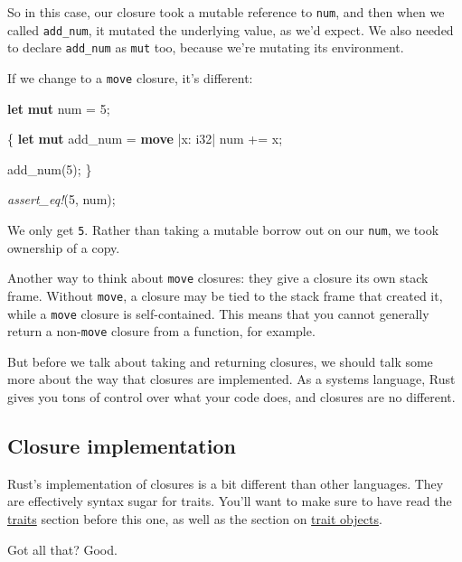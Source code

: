 \documentclass[a4paper,]{book}
\newenvironment{Shaded}{\begin{snugshade}}{\end{snugshade}}
\newcommand{\KeywordTok}[1]{\textcolor[rgb]{0.13,0.29,0.53}{\textbf{{#1}}}}
\newcommand{\DataTypeTok}[1]{\textcolor[rgb]{0.13,0.29,0.53}{{#1}}}
\newcommand{\DecValTok}[1]{\textcolor[rgb]{0.00,0.00,0.81}{{#1}}}
\newcommand{\PreprocessorTok}[1]{\textcolor[rgb]{0.56,0.35,0.01}{\textit{{#1}}}}
\newcommand{\NormalTok}[1]{{#1}}
\begin{document}
So in this case, our closure took a mutable reference to \texttt{num},
and then when we called \texttt{add\_num}, it mutated the underlying
value, as we'd expect. We also needed to declare \texttt{add\_num} as
\texttt{mut} too, because we're mutating its environment.

If we change to a \texttt{move} closure, it's different:

\begin{Shaded}
\begin{Highlighting}[]
\KeywordTok{let} \KeywordTok{mut} \NormalTok{num = }\DecValTok{5}\NormalTok{;}

\NormalTok{\{}
    \KeywordTok{let} \KeywordTok{mut} \NormalTok{add_num = }\KeywordTok{move} \NormalTok{|x: }\DataTypeTok{i32}\NormalTok{| num += x;}

    \NormalTok{add_num(}\DecValTok{5}\NormalTok{);}
\NormalTok{\}}

\PreprocessorTok{assert_eq!}\NormalTok{(}\DecValTok{5}\NormalTok{, num);}
\end{Highlighting}
\end{Shaded}

We only get \texttt{5}. Rather than taking a mutable borrow out on our
\texttt{num}, we took ownership of a copy.

Another way to think about \texttt{move} closures: they give a closure
its own stack frame. Without \texttt{move}, a closure may be tied to the
stack frame that created it, while a \texttt{move} closure is
self-contained. This means that you cannot generally return a
non-\texttt{move} closure from a function, for example.

But before we talk about taking and returning closures, we should talk
some more about the way that closures are implemented. As a systems
language, Rust gives you tons of control over what your code does, and
closures are no different.

\subsection{Closure implementation}\label{closure-implementation}

Rust's implementation of closures is a bit different than other
languages. They are effectively syntax sugar for traits. You'll want to
make sure to have read the \protect\hyperlink{sec--traits}{traits}
section before this one, as well as the section on
\protect\hyperlink{sec--trait-objects}{trait objects}.

Got all that? Good.
\end{document}
